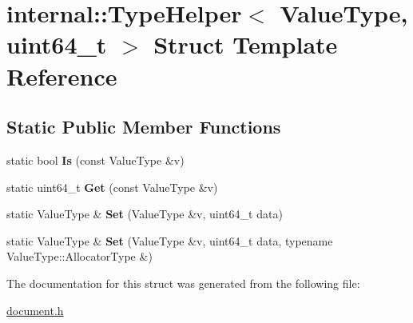 \hypertarget{a00321}{}\section{internal\+:\+:Type\+Helper$<$ Value\+Type, uint64\+\_\+t $>$ Struct Template Reference}
\label{a00321}
\subsection*{Static Public Member Functions}
\begin{DoxyCompactItemize}
\item 
static bool {\bfseries Is} (const Value\+Type \&v)\hypertarget{a00321_a4916651732ed27fa944c96a32cec5b88}{}\label{a00321_a4916651732ed27fa944c96a32cec5b88}

\item 
static uint64\+\_\+t {\bfseries Get} (const Value\+Type \&v)\hypertarget{a00321_a1b1b2e4fe3c38fb37701284c6571ee92}{}\label{a00321_a1b1b2e4fe3c38fb37701284c6571ee92}

\item 
static Value\+Type \& {\bfseries Set} (Value\+Type \&v, uint64\+\_\+t data)\hypertarget{a00321_a38392035fe5a647078b24f0e15a84145}{}\label{a00321_a38392035fe5a647078b24f0e15a84145}

\item 
static Value\+Type \& {\bfseries Set} (Value\+Type \&v, uint64\+\_\+t data, typename Value\+Type\+::\+Allocator\+Type \&)\hypertarget{a00321_a3c8b01c3e9a9e63c99bef2db9fdf3823}{}\label{a00321_a3c8b01c3e9a9e63c99bef2db9fdf3823}

\end{DoxyCompactItemize}


The documentation for this struct was generated from the following file\+:\begin{DoxyCompactItemize}
\item 
\hyperlink{a00473}{document.\+h}\end{DoxyCompactItemize}
